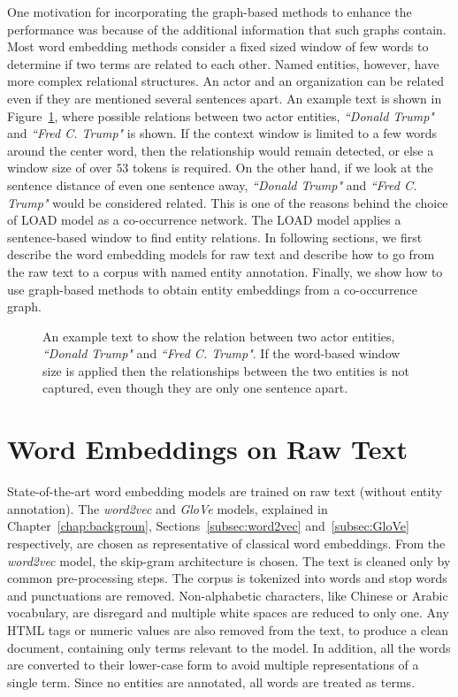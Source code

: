 One motivation for incorporating the graph-based methods to enhance the performance was because of the additional information that such graphs contain. Most word embedding methods consider a fixed sized window of few words to determine if two terms are related to each other. Named entities, however, have more complex relational structures. An actor and an organization can be related even if they are mentioned several sentences apart. An example text is shown in Figure~\ref{fig:article_entities}, where possible relations between  two actor entities, \emph{``Donald Trump"} and \emph{``Fred C. Trump"} is shown. If the context window is limited to a few words around the center word, then the relationship would remain detected, or else a window size of over $53$ tokens is required. On the other hand, if we look at the sentence distance of even one sentence away,  \emph{``Donald Trump"} and \emph{``Fred C. Trump"} would be considered related. This is one of the reasons behind the choice of LOAD model as a co-occurrence network. The LOAD model applies a sentence-based window to find entity relations. In following sections, we first describe the word embedding models for raw text and describe how to go from the raw text to a corpus with named entity annotation. Finally, we show how to use graph-based methods to obtain entity embeddings from a co-occurrence graph. 

\begin{figure}
\centering 
\resizebox{0.90\textwidth}{0.2\textwidth}{      

}
\caption{An example text to show the relation between two actor entities, \emph{``Donald Trump"} and \emph{``Fred C. Trump"}. If the word-based window size is applied then the relationships between the two entities is not captured, even though they are only one sentence apart. }
\label{fig:article_entities}
\end{figure}
\section{Word Embeddings on Raw Text}\label{sec:raw}
State-of-the-art word embedding models are trained on raw text (without entity annotation). The \emph{word2vec} and \emph{GloVe} models, explained in Chapter~\ref{chap:backgroun}, Sections~\ref{subsec:word2vec} and~\ref{subsec:GloVe} respectively, are chosen as representative of classical word embeddings. From the \emph{word2vec} model, the skip-gram architecture is chosen. The text is cleaned only by common pre-processing steps. The corpus is tokenized into words and stop words and punctuations are removed. Non-alphabetic characters, like Chinese or Arabic vocabulary, are disregard and multiple white spaces are reduced to only one.  Any HTML tags or numeric values are also removed from the text, to produce a clean document, containing only terms relevant to the model. In addition, all the words are converted to their lower-case form to avoid multiple representations of a single term. Since no entities are annotated, all words are treated as terms. 
